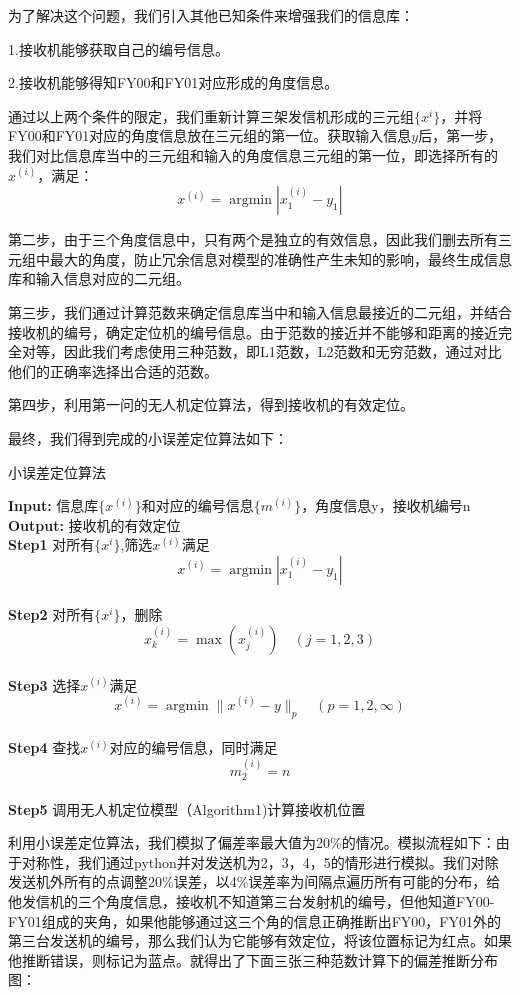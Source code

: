 \documentclass{my_paper}
\begin{document}
为了解决这个问题，我们引入其他已知条件来增强我们的信息库：

1.接收机能够获取自己的编号信息。

2.接收机能够得知FY00和FY01对应形成的角度信息。

通过以上两个条件的限定，我们重新计算三架发信机形成的三元组$\{x^{i}\}$，并将FY00和FY01对应的角度信息放在三元组的第一位。获取输入信息$y$后，第一步，我们对比信息库当中的三元组和输入的角度信息三元组的第一位，即选择所有的$x^{(i)}$，满足：$$x ^ { ( i ) } = \operatorname { argmin } | x ^ { ( i ) }_1 - y_1 |$$

第二步，由于三个角度信息中，只有两个是独立的有效信息，因此我们删去所有三元组中最大的角度，防止冗余信息对模型的准确性产生未知的影响，最终生成信息库和输入信息对应的二元组。

第三步，我们通过计算范数来确定信息库当中和输入信息最接近的二元组，并结合接收机的编号，确定定位机的编号信息。由于范数的接近并不能够和距离的接近完全对等，因此我们考虑使用三种范数，即L1范数，L2范数和无穷范数，通过对比他们的正确率选择出合适的范数。

第四步，利用第一问的无人机定位算法，得到接收机的有效定位。

最终，我们得到完成的小误差定位算法如下：
\begin{algorithm}[H]
\caption{\small 小误差定位算法}
\textbf{Input:} 信息库$\{x^{(i)}\}$和对应的编号信息$\{m^{(i)}\}$，角度信息y，接收机编号n\\
\textbf{Output:} 接收机的有效定位\\
\textbf{Step1} 对所有$\{x^{i}\}$,筛选$x^{(i)}$满足$$x ^ { ( i ) } = \operatorname { argmin } | x ^ { ( i ) }_1 - y_1 |$$\\
\textbf{Step2} 对所有$\{x^{i}\}$，删除$$x _ { k } ^ { ( i ) } = \max ( x _ { j } ^ { ( i ) } ) \quad ( j = 1,2,3 )$$\\
\textbf{Step3} 选择$x^{(i)}$满足$$x ^ { ( i ) } = \operatorname { argmin } \| x ^ { ( i ) } - y \| _  { p }\quad ( p = 1,2 , \infty )$$\\
\textbf{Step4} 查找$x^{(i)}$对应的编号信息，同时满足$$m^{(i)}_2=n$$\\
\textbf{Step5} 调用无人机定位模型（Algorithm1)计算接收机位置\\
\end{algorithm}

利用小误差定位算法，我们模拟了偏差率最大值为20\%的情况。模拟流程如下：由于对称性，我们通过python并对发送机为2，3，4，5的情形进行模拟。我们对除发送机外所有的点调整20\%误差，以4\%误差率为间隔点遍历所有可能的分布，给他发信机的三个角度信息，接收机不知道第三台发射机的编号，但他知道FY00-FY01组成的夹角，如果他能够通过这三个角的信息正确推断出FY00，FY01外的第三台发送机的编号，那么我们认为它能够有效定位，将该位置标记为红点。如果他推断错误，则标记为蓝点。就得出了下面三张三种范数计算下的偏差推断分布图：
\end{document}
